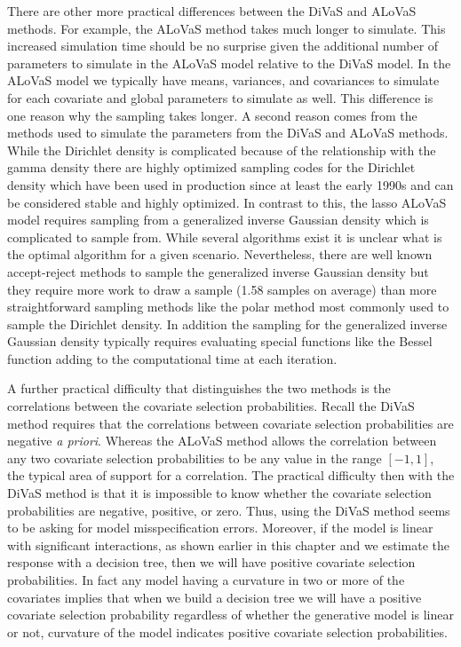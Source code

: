 There are other more practical differences between the DiVaS and ALoVaS methods. For example, the ALoVaS method takes much longer to simulate. This increased simulation time should be no surprise given the additional number of parameters to simulate in the ALoVaS model relative to the DiVaS model. In the ALoVaS model we typically have means, variances, and covariances to simulate for each covariate and global parameters to simulate as well. This difference is one reason why the sampling takes longer. A second reason comes from the methods used to simulate the parameters from the DiVaS and ALoVaS methods. While the Dirichlet density is complicated because of the relationship with the gamma density there are highly optimized sampling codes for the Dirichlet density which have been used in production since at least the early 1990s and can be considered stable and highly optimized. In contrast to this, the lasso ALoVaS model requires sampling from a generalized inverse Gaussian density which is complicated to sample from. While several algorithms exist it is unclear what is the optimal algorithm for a given scenario. Nevertheless, there are well known accept-reject methods to sample the generalized inverse Gaussian density but they require more work to draw a sample (1.58 samples on average)  than more straightforward sampling methods like the polar method most commonly used to sample the Dirichlet density. In addition the sampling for the generalized inverse Gaussian density typically requires evaluating special functions like the Bessel function adding to the computational time at each iteration. 

A further practical difficulty that distinguishes the two methods is the correlations between the covariate selection probabilities. Recall the DiVaS method requires that the correlations between covariate selection probabilities are negative \emph{a priori}. Whereas the ALoVaS method allows the correlation between any two covariate selection probabilities to be any value in the range $[-1,1]$, the typical area of support for a correlation. The practical difficulty then with the DiVaS method is that it is impossible to know whether the covariate selection probabilities are negative, positive, or zero. Thus, using the DiVaS method seems to be asking for model misspecification errors. Moreover, if the model is linear with significant interactions, as shown earlier in this chapter and we estimate the response with a decision tree, then we will have positive covariate selection probabilities. 
In fact any model having a curvature in two or more of the covariates implies that when we build a decision tree we will have a positive covariate selection probability regardless of whether the generative model is linear or not, curvature of the model indicates positive covariate selection probabilities. 

